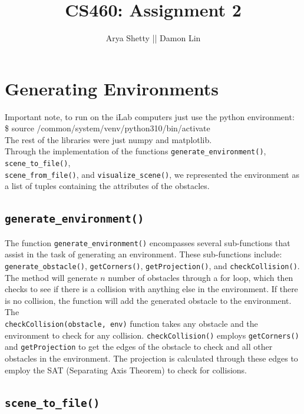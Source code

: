 \documentclass{article}
\title{CS460: Assignment 2}
\author{Arya Shetty || Damon Lin}
\begin{document}
\maketitle

\section{Generating Environments}

Important note, to run on the iLab computers just use the python environment: \\
\$ source /common/system/venv/python310/bin/activate \\
The rest of the libraries were just numpy and matplotlib.
\\

Through the implementation of the functions \texttt{generate\_environment()}, \texttt{scene\_to\_file()}, \\ \texttt{scene\_from\_file()}, and \texttt{visualize\_scene()}, we represented the environment as a list of tuples containing the attributes of the obstacles.

\subsection{\texttt{generate\_environment()}}
The function \texttt{generate\_environment()} encompasses several sub-functions that assist in the task of generating an environment. These sub-functions include: \texttt{generate\_obstacle()}, \texttt{getCorners()}, \texttt{getProjection()}, and \texttt{checkCollision()}. The method will generate $n$ number of obstacles through a for loop, which then checks to see if there is a collision with anything else in the environment. If there is no collision, the function will add the generated obstacle to the environment. The \\ \texttt{checkCollision(obstacle, env)} function takes any obstacle and the environment to check for any collision. \texttt{checkCollision()} employs \texttt{getCorners()} and \texttt{getProjection} to get the edges of the obstacle to check and all other obstacles in the environment. The projection is calculated through these edges to employ the SAT (Separating Axis Theorem) to check for collisions.

\subsection{\texttt{scene\_to\_file()}}
\end{document}
